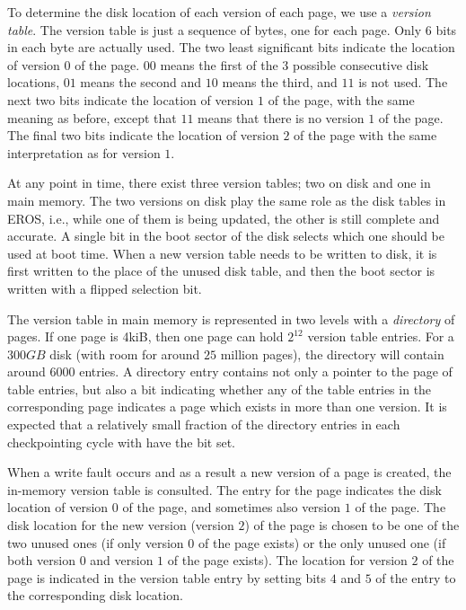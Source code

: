 To determine the disk location of each version of each page, we use a
\emph{version table}.  The version table is just a sequence of bytes,
one for each page.  Only 6 bits in each byte are actually used.  The
two least significant bits indicate the location of version $0$ of the
page.  $00$ means the first of the $3$ possible consecutive disk
locations, $01$ means the second and $10$ means the third, and $11$ is
not used.  The next two bits indicate the location of version $1$ of
the page, with the same meaning as before, except that $11$ means that
there is no version $1$ of the page.  The final two bits indicate the
location of version $2$ of the page with the same interpretation as
for version $1$.

At any point in time, there exist three version tables; two on disk
and one in main memory.  The two versions on disk play the same role
as the disk tables in EROS, i.e., while one of them is being updated,
the other is still complete and accurate.  A single bit in the boot
sector of the disk selects which one should be used at boot time.
When a new version table needs to be written to disk, it is first
written to the place of the unused disk table, and then the boot
sector is written with a flipped selection bit.

The version table in main memory is represented in two levels with a
\emph{directory} of pages.  If one page is 4kiB, then one page can
hold $2^{12}$ version table entries.  For a $300GB$ disk (with room
for around $25$ million pages), the directory will contain around
$6000$ entries.  A directory entry contains not only a pointer to the
page of table entries, but also a bit indicating whether any of the
table entries in the corresponding page indicates a page which exists
in more than one version.  It is expected that a relatively small
fraction of the directory entries in each checkpointing cycle with
have the bit set.

When a write fault occurs and as a result a new version of a page is
created, the in-memory version table is consulted.  The entry for the
page indicates the disk location of version $0$ of the page, and
sometimes also version $1$ of the page.  The disk location for the new
version (version $2$) of the page is chosen to be one of the two
unused ones (if only version $0$ of the page exists) or the only
unused one (if both version $0$ and version $1$ of the page exists).
The location for version $2$ of the page is indicated in the version
table entry by setting bits $4$ and $5$ of the entry to the
corresponding disk location.

